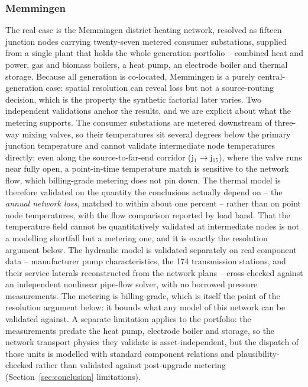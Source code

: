 \documentclass[a4paper,fleqn]{cas-dc}
\begin{document}
\subsubsection{Memmingen}
The real case is the Memmingen district-heating network, resolved as fifteen junction nodes
carrying twenty-seven metered consumer substations, supplied from a single plant that holds
the whole generation portfolio -- combined heat and power, gas and biomass boilers, a heat
pump, an electrode boiler and thermal storage. Because all generation is co-located, Memmingen
is a purely central-generation case: spatial resolution can reveal loss but not a source-routing
decision, which is the property the synthetic factorial later varies. Two independent
validations anchor the results, and we are explicit about what the metering supports. The
consumer substations are metered downstream of three-way mixing valves, so their temperatures
sit several degrees below the primary junction temperature and cannot validate intermediate node
temperatures directly; even along the source-to-far-end corridor (j$_1\to$j$_{15}$), where the
valve runs near fully open, a point-in-time temperature match is sensitive to the network flow,
which billing-grade metering does not pin down. The thermal model is therefore validated on the
quantity the conclusions actually depend on -- the \emph{annual network loss}, matched to within
about one percent -- rather than on point node temperatures, with the flow comparison reported by
load band. That the temperature field cannot be quantitatively validated at intermediate nodes is
not a modelling shortfall but a metering one, and it is exactly the resolution argument below. The hydraulic model is
validated separately on real component data -- manufacturer pump characteristics, the 174
transmission stations, and their service laterals reconstructed from the network plans --
cross-checked against an independent nonlinear pipe-flow solver, with no borrowed pressure
measurements. The metering is billing-grade, which is itself the point of the resolution
argument below: it bounds what any model of this network can be validated against. A separate
limitation applies to the portfolio: the measurements predate the heat pump, electrode boiler
and storage, so the network transport physics they validate is asset-independent, but the
dispatch of those units is modelled with standard component relations and plausibility-checked
rather than validated against post-upgrade metering (Section~\ref{sec:conclusion} limitations).

\end{document}
